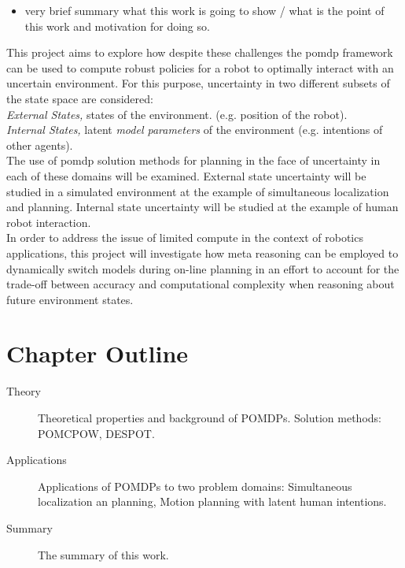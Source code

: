 \begin{itemize}
  \item very brief summary what this work is going to show / what is the point
        of this work and motivation for doing so.
\end{itemize}

This project aims to explore how despite these challenges the \ac{pomdp}
framework can be used to compute robust policies for a robot to optimally
interact with an uncertain environment. For this purpose, uncertainty in
two different subsets of the state space are considered:\\
\emph{External States,}  states of the environment. (e.g. position of the
robot).\\
\emph{Internal States,} latent \emph{model parameters} of the
environment (e.g. intentions of other agents).\\

The use of \ac{pomdp} solution methods for planning in the face of uncertainty in
each of these domains will be examined. External state uncertainty will be
studied in a simulated environment at the example of simultaneous localization
and planning. Internal state uncertainty will be studied at the example of
human robot interaction.\\
In order to address the issue of limited compute in the context of robotics
applications, this project will investigate how meta reasoning can be employed to
dynamically switch models during on-line planning in an effort to account for
the trade-off between accuracy and computational complexity when reasoning about
future environment states.

\section{Chapter Outline}


\begin{description}
  \item[Theory] Theoretical properties and background of POMDPs. Solution methods: POMCPOW, DESPOT.
  \item[Applications] Applications of POMDPs to two problem domains: Simultaneous localization an planning, Motion planning with latent human intentions.
  \item[Summary] The summary of this work.
\end{description}
